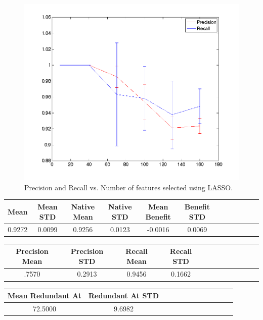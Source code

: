 \begin{center}
\begin{figure}[!ht]
\centering
\includegraphics[width=.7\textwidth]{../images/precisionrecallExpansion.png}
\caption{Precision and Recall vs. Number of features selected using LASSO.}
\label{fig:prec recall}
\end{figure}
\end{center}

\begin{tabular}{cccccccccccc}
\hline
Mean&Mean STD&Native Mean&Native STD&Mean Benefit&Benefit STD
\\
\hline
0.9272&0.0099&0.9256&0.0123&-0.0016&0.0069
\end{tabular}


\begin{tabular}{cccccccccccc}
\hline
Precision Mean&Precision STD&Recall Mean&Recall STD
\\
\hline
.7570&0.2913&0.9456&0.1662
\end{tabular}


\begin{tabular}{cccccccccccc}
\hline
Mean Redundant At&Redundant At STD\\
\hline
72.5000&9.6982
\end{tabular}
